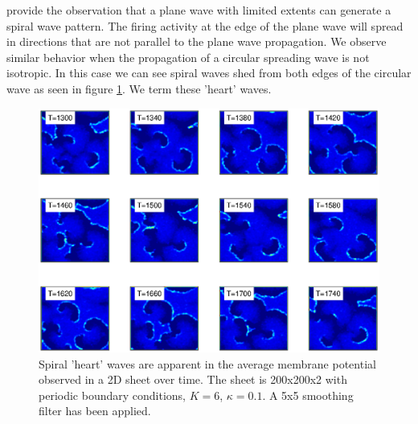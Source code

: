 \citet{Huang2010} provide the observation that a plane wave with limited extents can generate a spiral wave pattern.
The firing activity at the edge of the plane wave will spread in directions that are not parallel to the plane wave propagation.
We observe similar behavior when the propagation of a circular spreading wave is not isotropic.
In this case we can see spiral waves shed from both edges of the circular wave as seen in figure \ref{fig:2DHeartWaves}.
We term these 'heart' waves.
\begin{figure}[!htb]
 \caption{ Spiral 'heart' waves are apparent in the average membrane potential observed in a 2D sheet over time. 
           The sheet is 200x200x2 with periodic boundary conditions, $K=6$, $\kappa=0.1$.
           A 5x5 smoothing filter has been applied. }
 \label{fig:2DHeartWaves}
 \centering
   \includegraphics[width=\textwidth]{fig/2DSpiralWaves_HeartWaves}
\end{figure}
\FloatBarrier

